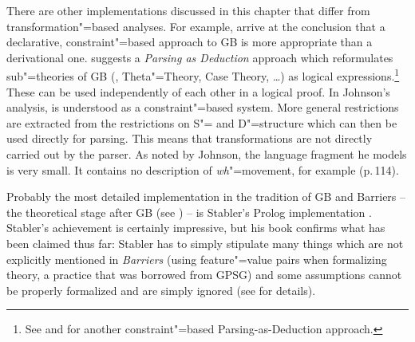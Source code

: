 There are other implementations discussed in this chapter that differ from transformation"=based analyses. For example, \citet[, Section~4]{KT91a}
arrive at the conclusion that a declarative, constraint"=based approach to GB is more appropriate than a derivational one. \citet{Johnson89a}
suggests a \emph{Parsing as Deduction} approach which reformulates sub"=theories of GB (\xbart,
Theta"=Theory, Case Theory, \ldots) as logical expressions.\footnote{%
	See  and  for another constraint"=based Parsing-as-Deduction approach.
}
These can be used independently of each other in a logical proof. In Johnson's analysis, \gbt is understood as a constraint"=based system. 
More general restrictions are extracted from the restrictions on S"= and D"=structure which can then be used directly for parsing. This means that 
transformations are not directly carried out by the parser. As noted by Johnson, the language fragment he models is very small. It contains no
description of \emph{wh}"=movement, for example (p.\,114). 

Probably the most detailed implementation in the tradition of GB and Barriers -- the theoretical
stage after GB (see \citealp{Chomsky86b}) -- is Stabler's Prolog implementation
\citeyearpar{Stabler92a-u}. Stabler's achievement is certainly impressive, but his book confirms what has been claimed thus far: Stabler has to simply stipulate many
things which are not explicitly mentioned in \emph{Barriers} (\eg using feature"=value pairs when
formalizing \xbar theory, a practice that was borrowed from GPSG\indexgpsg) and some assumptions
cannot be properly formalized and are simply ignored (see \citealp{Briscoe97a} for details). 

